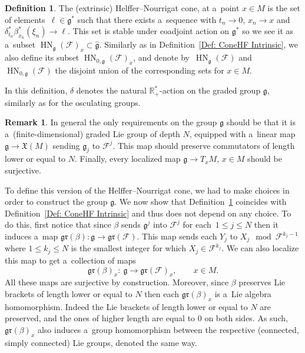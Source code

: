 \documentclass[pdftex]{sigma}
\newcommand{\R}{\mathbb R} %
\newcommand{\N}{\mathbb N} %
\newcommand{\F}{\mathcal{F}} %
\newcommand{\g}{\mathfrak{g}} %
\newcommand{\HN}{\operatorname{HN}} %
\newcommand{\Fb}{\mathcal{F}} %
\newcommand{\gr}{\mathfrak{gr}} %
\numberwithin{equation}{section}
\theoremstyle{definition}
\newtheorem{mydef}[thm]{Definition}
\newtheorem{rem}[thm]{Remark}
\begin{document}
\begin{mydef}\label{Def: ConeHN Extrinsic}
 The (extrinsic) Helffer--Nourrigat cone, at a~point $x\in M$ is the set of elements~${\ell \in \g^*}$ such that there exists a~sequence \smash{$((t_n,x_n,\xi_n))_{n\in \N} \in \bigl(\R^*_+ \times T^*M\bigr)^{\N}$} with $t_n\rightarrow 0$, $x_n\rightarrow x$ and $\delta_{t_n}^*\beta_{x_n}^*(\xi_n) \rightarrow \ell$.
 This set is stable under coadjoint action on $\g^*$ so we see it as a~subset $\HN_{\g}(\Fb)_x \subset \widehat{\g}$. Similarly as in Definition~\ref{Def: ConeHF Intrinsic}, we also define its subset $\HN_{0,\g}(\Fb)_x$, and denote by~$\HN_{\g}(\F)$ and $\HN_{0,\g}(\F)$ the disjoint union of the corresponding sets for $x\in M$.
\end{mydef}

In this definition, $\delta$ denotes the natural $\R^*_+$-action on the graded group $\g$, similarly as for the osculating groups.

\begin{rem}
 In general the only requirements on the group $\g$ should be that it is a~(finite-dimensional) graded Lie group of depth $N$, equipped with a~linear map $\g \to \mathfrak{X}(M)$ sending $\g_j$ to $\F^j$. This map should preserve commutators of length lower or equal to $N$. Finally, every localized map $\g \to T_xM$, $x\in M$ should be surjective.
\end{rem}

To define this version of the Helffer--Nourrigat cone, we had to make choices in order to construct the group $\g$. We now show that Definition~\ref{Def: ConeHN Extrinsic} coincides with Definition~\ref{Def: ConeHF Intrinsic} and thus does not depend on any choice. To do this, first notice that since $\beta$ sends $\g^j$ into $\F^j$ for each~${1\leq j \leq N}$ then it induces a~map $\gr(\beta) \colon \g \to \gr(\Fb)$.
This map sends each $Y_j$ to $X_j \mod \F^{k_j-1}$ where $1\leq k_j\leq N$ is the smallest integer for which $X_j \in \F^{k_j}$. We can also localize this map to get a~collection of maps
\[\gr(\beta)_x \colon\ \g \to \gr(\Fb)_x,\qquad x \in M.\]
All these maps are surjective by construction. Moreover, since $\beta$ preserves Lie brackets of length lower or equal to $N$ then each $\gr(\beta)_x$ is a~Lie algebra homomorphism. Indeed the Lie brackets of length lower or equal to $N$ are preserved, and the ones of higher length are equal to $0$ on both sides. As such, $\gr(\beta)_x$ also induces a~group homomorphism between the respective (connected, simply connected) Lie groups, denoted the same way.
\end{document}
